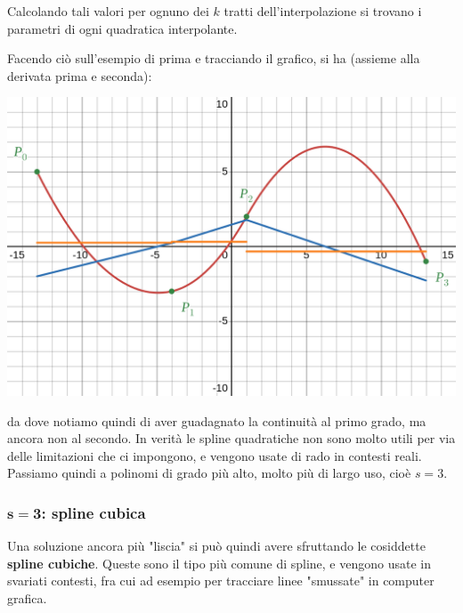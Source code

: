 \documentclass[a4paper,11pt]{article}
\begin{document}
Calcolando tali valori per ognuno dei $k$ tratti dell'interpolazione si trovano i parametri di ogni quadratica interpolante.

\newpage

Facendo ciò sull'esempio di prima e tracciando il grafico, si ha (assieme alla derivata prima e seconda):
\begin{center}
	\includegraphics[scale=0.3]{../figures/multipoly_2.png}
\end{center}
da dove notiamo quindi di aver guadagnato la continuità al primo grado, ma ancora non al secondo.
In verità le spline quadratiche non sono molto utili per via delle limitazioni che ci impongono, e vengono usate di rado in contesti reali.
Passiamo quindi a polinomi di grado più alto, molto più di largo uso, cioè $s = 3$.

\subsubsection{$\mathbf{s = 3}$: spline cubica}
Una soluzione ancora più "liscia" si può quindi avere sfruttando le cosiddette \textbf{spline cubiche}.
Queste sono il tipo più comune di spline, e vengono usate in svariati contesti, fra cui ad esempio per tracciare linee "smussate" in computer grafica.
\end{document}
